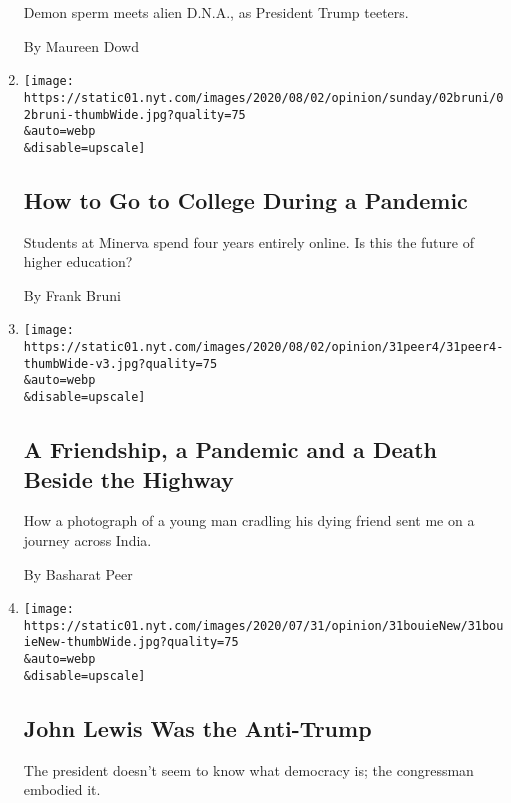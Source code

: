 \begin{enumerate}
  Demon sperm meets alien D.N.A., as President Trump teeters.

  By Maureen Dowd
\item
  \href{/2020/08/01/opinion/sunday/minerva-college-coronavirus.html}{}

  \texttt{[image: https://static01.nyt.com/images/2020/08/02/opinion/sunday/02bruni/02bruni-thumbWide.jpg?quality=75\\\&auto=webp\\\&disable=upscale]}

  \hypertarget{how-to-go-to-college-during-a-pandemic}{%
  \subsection{How to Go to College During a
  Pandemic}\label{how-to-go-to-college-during-a-pandemic}}

  Students at Minerva spend four years entirely online. Is this the
  future of higher education?

  By Frank Bruni
\item
  \href{/2020/07/31/opinion/sunday/India-migration-coronavirus.html}{}

  \texttt{[image: https://static01.nyt.com/images/2020/08/02/opinion/31peer4/31peer4-thumbWide-v3.jpg?quality=75\\\&auto=webp\\\&disable=upscale]}

  \hypertarget{a-friendship-a-pandemic-and-a-death-beside-the-highway}{%
  \subsection{A Friendship, a Pandemic and a Death Beside the
  Highway}\label{a-friendship-a-pandemic-and-a-death-beside-the-highway}}

  How a photograph of a young man cradling his dying friend sent me on a
  journey across India.

  By Basharat Peer
\item
  \href{/2020/07/31/opinion/sunday/john-lewis-trump-election-2020.html}{}

  \texttt{[image: https://static01.nyt.com/images/2020/07/31/opinion/31bouieNew/31bouieNew-thumbWide.jpg?quality=75\\\&auto=webp\\\&disable=upscale]}

  \hypertarget{john-lewis-was-the-anti-trump}{%
  \subsection{John Lewis Was the
  Anti-Trump}\label{john-lewis-was-the-anti-trump}}

  The president doesn't seem to know what democracy is; the congressman
  embodied it.


\end{enumerate}
